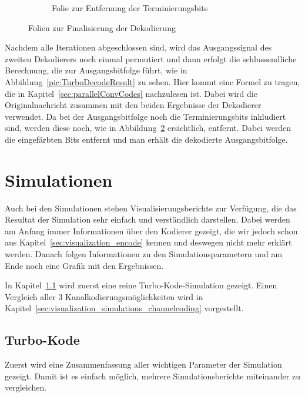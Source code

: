 \begin{figure}[th]
\begin{subfigure}{0.45\textwidth}
	\caption{Folie zur Entfernung der Terminierungsbits}
	\label{pic:TurboDecodeTerminate}
	\end{subfigure}
\caption{Folien zur Finalisierung der Dekodierung}
\end{figure}

Nachdem alle Iterationen abgeschlossen sind, wird das Ausgangssignal des zweiten Dekodierers noch einmal permutiert und dann erfolgt die schlussendliche Berechnung, die zur Ausgangsbitfolge führt, wie in Abbildung~\ref{pic:TurboDecodeResult} zu sehen. Hier kommt eine Formel zu tragen, die in Kapitel~\ref{sec:parallelConvCodes} nachzulesen ist. Dabei wird die Originalnachricht zusammen mit den beiden Ergebnisse der Dekodierer verwendet. Da bei der Ausgangsbitfolge noch die Terminierungsbits inkludiert sind, werden diese noch, wie in Abbildung~\ref{pic:TurboDecodeTerminate} ersichtlich, entfernt. Dabei werden die eingefärbten Bits entfernt und man erhält die dekodierte Ausgangsbitfolge.

\FloatBarrier
\section{Simulationen}
\label{sec:visualization_simulation}
Auch bei den Simulationen stehen Visualisierungsberichte zur Verfügung, die das Resultat der Simulation sehr einfach und verständlich darstellen. Dabei werden am Anfang immer Informationen über den Kodierer gezeigt, die wir jedoch schon aus Kapitel~\ref{sec:visualization_encode} kennen und deswegen nicht mehr erklärt werden. Danach folgen Informationen zu den Simulationsparametern und am Ende noch eine Grafik mit den Ergebnissen.

In Kapitel~\ref{sec:visualization_simulations_turbo} wird zuerst eine reine Turbo-Kode-Simulation gezeigt. Einen Vergleich aller 3 Kanalkodierungsmöglichkeiten wird in Kapitel~\ref{sec:visualization_simulations_channelcoding} vorgestellt.

\FloatBarrier
\subsection{Turbo-Kode}
\label{sec:visualization_simulations_turbo}
Zuerst wird eine Zusammenfassung aller wichtigen Parameter der Simulation gezeigt. Damit ist es einfach möglich, mehrere Simulationsberichte miteinander zu vergleichen.

